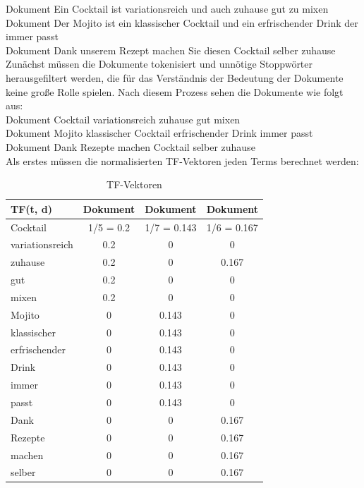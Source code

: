 Dokument  \glqq Ein Cocktail ist variationsreich und auch zuhause gut zu mixen\grqq{}\\
Dokument  \glqq Der Mojito ist ein klassischer Cocktail und ein erfrischender Drink der 
immer passt\grqq{}\\
Dokument  \glqq Dank unserem Rezept machen Sie diesen Cocktail selber zuhause\grqq{}\\
Zunächst müssen die Dokumente tokenisiert und unnötige Stoppwörter herausgefiltert werden, die für das Verständnis der Bedeutung der Dokumente keine große Rolle spielen. 
Nach diesem Prozess sehen die Dokumente wie folgt aus:\\
Dokument  \glqq Cocktail variationsreich zuhause gut mixen\grqq{}\\
Dokument  \glqq Mojito klassischer Cocktail erfrischender Drink immer passt\grqq{}\\
Dokument  \glqq Dank Rezepte machen Cocktail selber zuhause\grqq{}\\
Als erstes müssen die normalisierten \ac{TF}-Vektoren jeden Terms berechnet werden:
\begin{table}[H]
    \centering
    \begin{tabular}{l|c|c|c}
        TF(t, d)          & Dokument \textnumero 1 & Dokument \textnumero 2 & Dokument \textnumero 3 \\
        \hline
        Cocktail            & 1/5 = 0.2             & 1/7 = 0.143      & 1/6 = 0.167 \\
        \hline
        variationsreich & 0.2             & 0 & 0      \\
        \hline
        zuhause                & 0.2           & 0    & 0.167 \\
        \hline
        gut                  & 0.2             & 0      & 0  \\
        \hline
        mixen            & 0.2             & 0      & 0 \\
        \hline
        Mojito & 0             & 0.143 & 0      \\
        \hline
        klassischer                & 0           & 0.143    & 0 \\
        \hline
        erfrischender                  & 0             & 0.143      & 0   \\
        \hline
        Drink            & 0             & 0.143      & 0 \\
        \hline
        immer & 0             & 0.143 & 0      \\
        \hline
        passt                & 0          & 0.143    & 0 \\
        \hline
        Dank                  & 0             & 0      & 0.167   \\
        \hline
        Rezepte            & 0             & 0      & 0.167 \\
        \hline
        machen & 0             & 0 & 0.167      \\
        \hline
        selber                & 0           & 0    & 0.167\\
    \end{tabular}
    \caption{\label{table:TF_Vektoren}TF-Vektoren}
\end{table}

